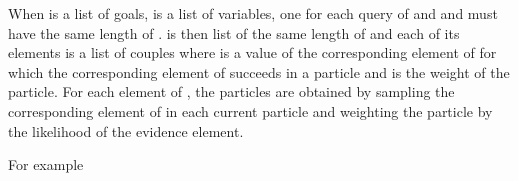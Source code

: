 \documentclass[letterpaper,10pt,english]{sphinxmanual}
\begin{document}
\sphinxAtStartPar
When  is a list of goals,  is a list of variables, one for each query of  and  and  must have the same length of .
 is then list of the same length of  and each of its elements is a list of couples  where  is a value of the corresponding element of  for which the corresponding element of  succeeds in a particle and  is the weight of the particle.
For each element of , the particles are obtained by sampling the corresponding element of  in each current particle and weighting the particle by the likelihood of the evidence element.

\sphinxAtStartPar
For example

\begin{sphinxVerbatim}[commandchars=\\\{\}]
\PYG{p}{[}\PYG{p}{]}\PYG{p}{[}   \PYG{p}{]}
\PYG{p}{[}
\PYG{p}{]}
\PYG{p}{[}\PYG{p}{]}
\PYG{p}{[}\PYG{p}{]}\PYG{p}{[}\PYG{p}{]}
\end{sphinxVerbatim}
\end{document}
